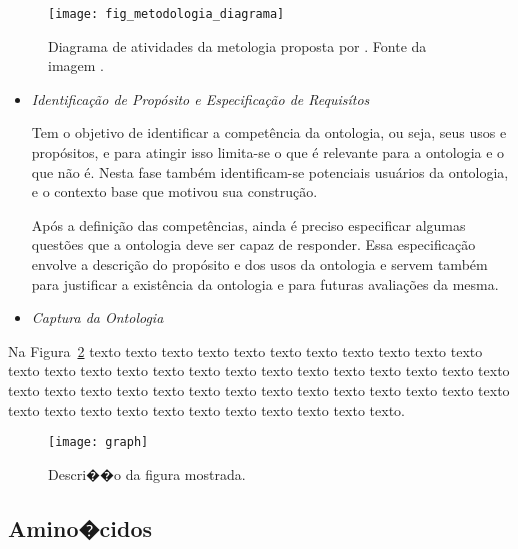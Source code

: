 \begin{figure}[!h]
  \centering
  \texttt{[image: fig\_metodologia\_diagrama]} 
  \caption{Diagrama de atividades da metologia proposta por 
    \cite{guizzardidesenvolvimento}. Fonte da imagem \cite{morais2007ontologias}. 
  }
  \label{fig:diagrama_metodologia} 
\end{figure}

\begin{itemize}
    \item \textit{Identificação de Propósito e Especificação de Requisítos}
    
    Tem o objetivo de identificar a competência da ontologia, ou seja, seus usos
    e propósitos, e para atingir isso limita-se o que é relevante para a ontologia
    e o que não é. Nesta fase também identificam-se potenciais usuários da ontologia,
    e o contexto base que motivou sua construção.
    
    Após a definição das competências, ainda é preciso especificar algumas 
    questões que a ontologia deve ser capaz de responder. Essa especificação 
    envolve a descrição do propósito e dos usos da ontologia e servem também para
    justificar a existência da ontologia e para futuras avaliações da mesma.
    
    \item \textit{Captura da Ontologia}
    
    
\end{itemize}



Na Figura~\ref{fig:humanbeta} texto texto texto texto texto texto texto texto
texto texto texto texto texto texto texto texto texto texto texto texto texto
texto texto texto texto texto texto texto texto texto texto texto texto texto
texto texto texto texto texto texto texto texto texto texto texto texto texto
texto texto texto.

\begin{figure}[!h]
  \centering
  \texttt{[image: graph]} 
  \caption{Descri��o da figura mostrada.}
  \label{fig:humanbeta} 
\end{figure}

\subsection{Amino�cidos}
\label{sec:amino_acidos}

